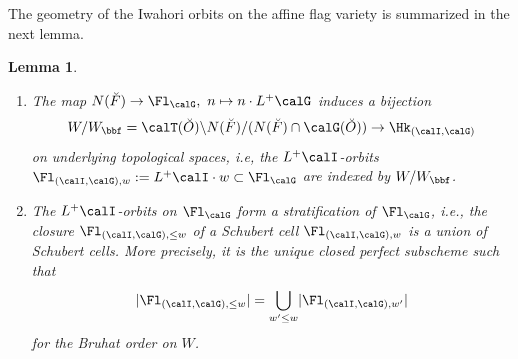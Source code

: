 \documentclass[10pt, reqno]{amsart}
\theoremstyle{plain}
\newtheorem{lemma}[theorem]{Lemma}
\theoremstyle{definition}
\numberwithin{equation}{section}
\begin{document}
	The geometry of the Iwahori orbits on the affine flag variety is summarized in the next lemma.
	
	\begin{lemma}
		\label{sec:geometry-affine-flag-1-stratification-of-affine-flag-variety}
		\begin{enumerate}
			\item The map $N(\breve{F})\to \Fl_{\calG},\ n\mapsto n\cdot L^+\calG$ induces a bijection
			\begin{equation}
				W/W_\bbf=\calT(\breve{O})\backslash N(\breve{F})/(N(\breve{F})\cap \calG(\breve{O}))\to \Hk_{(\calI,\calG)}
			\end{equation}
			on underlying topological spaces, i.e, the $L^+\calI$-orbits $\Fl_{(\calI,\calG),w}:=L^+\calI\cdot w\subset \Fl_{\calG}$ are indexed by $W/W_\bbf$.
			\item The $L^+\calI$-orbits on $\Fl_{\calG}$ form a stratification of $\Fl_{\calG}$, i.e., the closure $\Fl_{(\calI,\calG),\leq w}$ of a Schubert cell $\Fl_{(\calI,\calG),w}$ is a union of Schubert cells. More precisely, it is the unique closed perfect subscheme such that
			\begin{equation}
				\lvert \Fl_{(\calI,\calG),\leq w}\rvert=\bigcup\limits_{w^\prime\leq w}\lvert \Fl_{(\calI,\calG),w^\prime}\rvert
			\end{equation}
			for the Bruhat order on $W$.

		\end{enumerate}
	\end{lemma}
\end{document}
